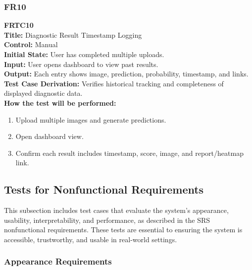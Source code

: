 \documentclass[12pt, titlepage]{article}
\begin{document}
\vspace{1em}
\subsubsection{FR10}
\textbf{FRTC10}\\
\textbf{Title:} Diagnostic Result Timestamp Logging\\
\textbf{Control:} Manual\\
\textbf{Initial State:} User has completed multiple uploads.\\
\textbf{Input:} User opens dashboard to view past results.\\
\textbf{Output:} Each entry shows image, prediction, probability, timestamp, and links.\\
\textbf{Test Case Derivation:} Verifies historical tracking and completeness of displayed diagnostic data.\\
\textbf{How the test will be performed:}
\begin{enumerate}
  \item Upload multiple images and generate predictions.
  \item Open dashboard view.
  \item Confirm each result includes timestamp, score, image, and report/heatmap link.
\end{enumerate}

\subsection{Tests for Nonfunctional Requirements}


This subsection includes test cases that evaluate the system's appearance, usability, interpretability, and performance, as described in the SRS nonfunctional requirements. These tests are essential to ensuring the system is accessible, trustworthy, and usable in real-world settings.

\subsubsection{Appearance Requirements}
\end{document}
